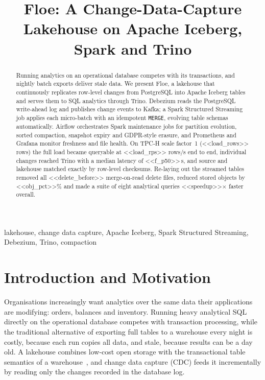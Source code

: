 \documentclass[conference,a4paper]{IEEEtran}
\newcommand{\code}[1]{\texttt{#1}}
\begin{document}
\title{Floe: A Change-Data-Capture Lakehouse on Apache Iceberg, Spark and Trino}

\author{
}

\maketitle

\begin{abstract}
Running analytics on an operational database competes with its transactions, and nightly batch exports deliver
stale data. We present Floe, a lakehouse that continuously replicates row-level changes from PostgreSQL into
Apache Iceberg tables and serves them to SQL analytics through Trino. Debezium reads the PostgreSQL write-ahead log
and publishes change events to Kafka; a Spark Structured Streaming job applies each micro-batch with an idempotent
\code{MERGE}, evolving table schemas automatically. Airflow orchestrates Spark maintenance jobs for partition
evolution, sorted compaction, snapshot expiry and GDPR-style erasure, and Prometheus and Grafana monitor freshness
and file health. On TPC-H scale factor~1 (<<load_rows>> rows) the full load became queryable at <<load_rps>> rows/s
end to end, individual changes reached Trino with a median latency of <<f_p50>>\,s, and source and lakehouse matched
exactly by row-level checksums. Re-laying out the streamed tables removed all <<delete_before>> merge-on-read delete
files, reduced stored objects by <<obj_pct>>\% and made a suite of eight analytical queries <<speedup>>$\times$ faster
overall.
\end{abstract}

\begin{IEEEkeywords}
lakehouse, change data capture, Apache Iceberg, Spark Structured Streaming, Debezium, Trino, compaction
\end{IEEEkeywords}

\section{Introduction and Motivation}
Organisations increasingly want analytics over the same data their applications are modifying: orders, balances
and inventory. Running heavy analytical SQL directly on the operational database competes with transaction
processing, while the traditional alternative of exporting full tables to a warehouse every night is costly, because
each run copies all data, and stale, because results can be a day old. A lakehouse combines low-cost open storage
with the transactional table semantics of a warehouse~\cite{armbrust2021}, and change data capture (CDC) feeds it
incrementally by reading only the changes recorded in the database log.
\end{document}
